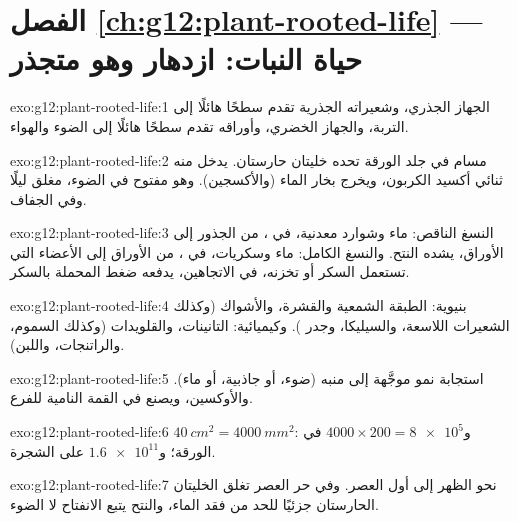 \section*{الفصل \ref{ch:g12:plant-rooted-life} --- حياة النبات: ازدهار وهو متجذر}

\begin{solution}{exo:g12:plant-rooted-life:1}
الجهاز الجذري، وشعيراته الجذرية تقدم سطحًا هائلًا إلى التربة، والجهاز
الخضري، وأوراقه تقدم سطحًا هائلًا إلى الضوء والهواء.
\end{solution}

\begin{solution}{exo:g12:plant-rooted-life:2}
مسام في جلد الورقة تحده خليتان حارستان. يدخل منه ثنائي أكسيد الكربون،
ويخرج بخار الماء (والأكسجين). وهو مفتوح في الضوء، مغلق ليلًا وفي
الجفاف.
\end{solution}

\begin{solution}{exo:g12:plant-rooted-life:3}
النسغ الناقص: ماء وشوارد معدنية، في ، من الجذور إلى الأوراق،
يشده النتح. والنسغ الكامل: ماء وسكريات، في ، من الأوراق إلى
الأعضاء التي تستعمل السكر أو تخزنه، في الاتجاهين، يدفعه ضغط 
المحملة بالسكر.
\end{solution}

\begin{solution}{exo:g12:plant-rooted-life:4}
بنيوية: الطبقة الشمعية والقشرة، والأشواك (وكذلك الشعيرات اللاسعة،
والسيليكا، وجدر ). وكيميائية: التانينات، والقلويدات (وكذلك
السموم، والراتنجات، واللبن).
\end{solution}

\begin{solution}{exo:g12:plant-rooted-life:5}
استجابة نمو موجَّهة إلى منبه (ضوء، أو جاذبية، أو ماء). والأوكسين،
ويصنع في القمة النامية للفرع.
\end{solution}

\begin{solution}{exo:g12:plant-rooted-life:6}
$\qty{40}{cm^2} = \qty{4000}{mm^2}$: و$4000 \times 200 = \num{8e5}$
 في الورقة؛ و$\num{1.6e11}$ على الشجرة.
\end{solution}

\begin{solution}{exo:g12:plant-rooted-life:7}
نحو الظهر إلى أول العصر. وفي حر العصر تغلق الخليتان الحارستان 
جزئيًا للحد من فقد الماء، والنتح يتبع الانفتاح لا الضوء.
\end{solution}

